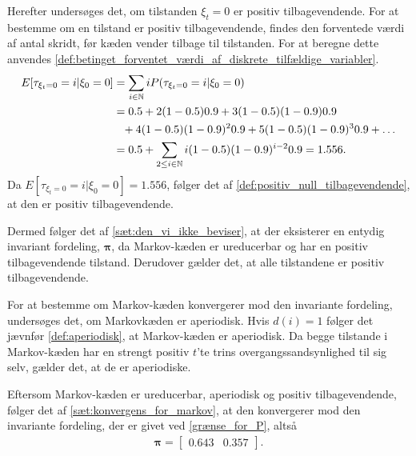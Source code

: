 Herefter undersøges det, om tilstanden $\xi_t = 0$ er positiv tilbagevendende. For at bestemme om en tilstand er positiv tilbagevendende, findes den forventede værdi af antal skridt, før kæden vender tilbage til tilstanden. For at beregne dette anvendes \autoref{def:betinget_forventet_værdi_af_diskrete_tilfældige_variabler}.
 \begin{align*}
     E[\tau_{\xi_{t} = 0}=i|\xi_0=0]&=\sum_{i\in \mathbb{N}} iP(\tau_{\xi_{t} = 0}=i|\xi_0=0)\\
     &=0.5+2(1-0.5)0.9+3(1-0.5)(1-0.9)0.9\\
     &\phantom{=} +4(1-0.5)(1-0.9)^20.9+5(1-0.5)(1-0.9)^30.9+\ldots\\
     &=0.5 + \sum_{2\leq i \in \mathbb{N} } i(1-0.5)(1-0.9)^{i-2}0.9 = 1.556.
 \end{align*}
Da $E[\tau_{\xi_{t} =0}=i|\xi_0=0]=1.556$, følger det af \autoref{def:positiv_null_tilbagevendende}, at den er positiv tilbagevendende.

Dermed følger det af \autoref{sæt:den_vi_ikke_beviser}, at der eksisterer en entydig invariant fordeling, $\bm \pi$, da Markov-kæden er ureducerbar og har en positiv tilbagevendende tilstand. Derudover gælder det, at alle tilstandene er positiv tilbagevendende.


For at bestemme om Markov-kæden konvergerer mod den invariante fordeling, undersøges det, om Markovkæden er aperiodisk. Hvis $d(i)=1$ følger det jævnfør \autoref{def:aperiodisk}, at Markov-kæden er aperiodisk. Da begge tilstande i Markov-kæden har en strengt positiv $t$'te trins overgangssandsynlighed til sig selv, gælder det, at de er aperiodiske. 

Eftersom Markov-kæden er ureducerbar, aperiodisk og positiv tilbagevendende, følger det af \autoref{sæt:konvergens_for_markov}, at den konvergerer mod den invariante fordeling, der er givet ved \eqref{grænse_for_P}, altså
\begin{align}
    \bm \pi = \begin{bmatrix} 0.643 & 0.357\end{bmatrix}.
\end{align}


